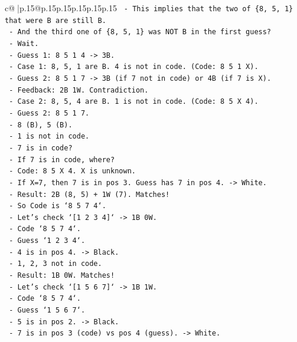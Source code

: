 \documentclass{article}
\begin{document}
{\begin{supertabular}{c@{$\;$}|p{.15\linewidth}@{}p{.15\linewidth}p{.15\linewidth}p{.15\linewidth}p{.15\linewidth}p{.15\linewidth}}
{{{\texttt{    {-} This implies that the two of \{8, 5, 1\} that were B are still B.} \\
\texttt{    {-} And the third one of \{8, 5, 1\} was NOT B in the first guess?} \\
\texttt{    {-} Wait.} \\
\texttt{    {-} Guess 1: 8 5 1 4 {-}> 3B.} \\
\texttt{      {-} Case 1: 8, 5, 1 are B. 4 is not in code. (Code: 8 5 1 X).} \\
\texttt{        {-} Guess 2: 8 5 1 7 {-}> 3B (if 7 not in code) or 4B (if 7 is X).} \\
\texttt{        {-} Feedback: 2B 1W. Contradiction.} \\
\texttt{      {-} Case 2: 8, 5, 4 are B. 1 is not in code. (Code: 8 5 X 4).} \\
\texttt{        {-} Guess 2: 8 5 1 7.} \\
\texttt{        {-} 8 (B), 5 (B).} \\
\texttt{        {-} 1 is not in code.} \\
\texttt{        {-} 7 is in code?} \\
\texttt{        {-} If 7 is in code, where?} \\
\texttt{        {-} Code: 8 5 X 4. X is unknown.} \\
\texttt{        {-} If X=7, then 7 is in pos 3. Guess has 7 in pos 4. {-}> White.} \\
\texttt{        {-} Result: 2B (8, 5) + 1W (7). Matches!} \\
\texttt{        {-} So Code is `8 5 7 4`.} \\
\texttt{        {-} Let's check `{[}1 2 3 4{]}` {-}> 1B 0W.} \\
\texttt{          {-} Code `8 5 7 4`.} \\
\texttt{          {-} Guess `1 2 3 4`.} \\
\texttt{          {-} 4 is in pos 4. {-}> Black.} \\
\texttt{          {-} 1, 2, 3 not in code.} \\
\texttt{          {-} Result: 1B 0W. Matches!} \\
\texttt{        {-} Let's check `{[}1 5 6 7{]}` {-}> 1B 1W.} \\
\texttt{          {-} Code `8 5 7 4`.} \\
\texttt{          {-} Guess `1 5 6 7`.} \\
\texttt{          {-} 5 is in pos 2. {-}> Black.} \\
\texttt{          {-} 7 is in pos 3 (code) vs pos 4 (guess). {-}> White.} \\
}}}
\end{supertabular}}
\end{document}
